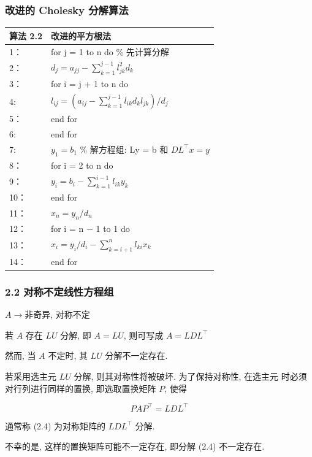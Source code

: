 \documentclass[notheorems,serif]{beamer}
\begin{document}
\begin{frame}
\frametitle{改进的 Cholesky 分解算法}
\begin{table}  
	\begin{tabular*}{16cm}{ll}  
		\hline  
		算法 2.2 &改进的平方根法\\  
		\hline  
		1：   & for j = 1 to n do \% 先计算分解\\  
		2：   & \qquad $d_{j}=a_{j j}-\sum_{k=1}^{j-1} l_{j k}^{2} d_{k}$\\
		3：   & \qquad for i = j + 1 to n do \\
		4:    & \qquad $l_{i j}=\left(a_{i j}-\sum_{k=1}^{j-1} l_{i k} d_{k} l_{j k}\right) / d_{j}$\\
		5：   & \qquad end for\\
		6:    & end for\\
		7:    & $y_1 = b_1$ \% 解方程组: Ly = b 和 $DL^{\top}x = y$\\
		8：   & for i = 2 to n do \\
		9：   & \qquad $y_{i}=b_{i}-\sum_{k=1}^{i-1} l_{i k} y_{k}$\\
		10：   & end for\\
		11：   & $x_{n}=y_{n} / d_{n}$\\
		12：   & for i = n − 1 to 1 do\\
		13：   & \qquad $x_{i}=y_{i} / d_{i}-\sum_{k=i+1}^{n} l_{k i} x_{k}$\\
		14：   & end for\\
		\hline  
	\end{tabular*}  
\end{table}
\end{frame}

\begin{frame}
\frametitle{2.2 \quad 对称不定线性方程组}
$A → $非奇异, 对称不定

若 $A$ 存在 $LU$ 分解, 即 $A = LU$, 则可写成 $A = LDL^{\top}$

然而, 当 $A$ 不定时, 其 $LU$ 分解不一定存在.

若采用选主元 $LU$ 分解, 则其对称性将被破坏. 为了保持对称性, 在选主元
时必须对行列进行同样的置换, 即选取置换矩阵 $P$, 使得

\begin{equation}
P A P^{\top}=L D L^{\top}
\end{equation}

通常称 (2.4) 为对称矩阵的 $LDL^{\top}$ 分解.

不幸的是, 这样的置换矩阵可能不一定存在, 即分解 (2.4) 不一定存在.
\end{frame}
\end{document}
